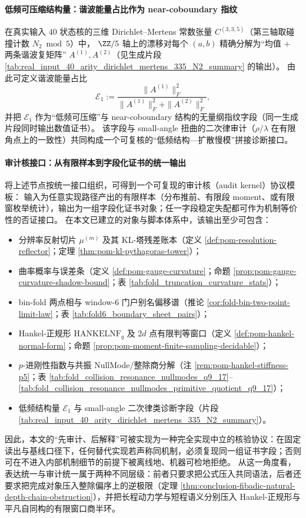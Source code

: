 \paragraph{低频可压缩结构量：谐波能量占比作为 near-coboundary 指纹}
在真实输入 \(40\) 状态核的三维 Dirichlet--Mertens 常数张量 \(C^{(3,3,5)}\)（第三轴取碰撞计数 \(N_2\bmod 5\)）中，
\(\ZZ/5\) 轴上的漂移对每个 \((a,b)\) 精确分解为“均值 \(+\) 两条谐波复矩阵” \(A^{(1)},A^{(2)}\)（见生成片段 \ref{tab:real_input_40_arity_dirichlet_mertens_335_N2_summary} 的输出）。
由此可定义谐波能量占比
\[
\mathcal{E}_1:=\frac{\|A^{(1)}\|_F^2}{\|A^{(1)}\|_F^2+\|A^{(2)}\|_F^2},
\]
并把 \(\mathcal{E}_1\) 作为“低频可压缩”与 near-coboundary 结构的无量纲指纹字段（同一生成片段同时输出数值证书）。
该字段与 small-angle 扭曲的二次律审计（\(\rho/\lambda\) 在有限角点上的一致性）共同构成一个可复核的“低频结构—扩散慢模”拼接诊断接口。

\paragraph{审计核接口：从有限样本到字段化证书的统一输出}
将上述节点按统一接口组织，可得到一个可复现的审计核（audit kernel）协议模板：
输入为任意实现路径产出的有限样本（分布推前、有限段 moment、或有限窗枚举统计），输出为一组字段化证书对象；任一字段稳定失配都可作为机制等价性的否证接口。
在本文已建立的对象与脚本体系中，该输出至少可包含：
\begin{itemize}
  \item 分辨率反射切片 \(\mu^{(m)}\) 及其 KL-塔残差账本（定义 \ref{def:pom-resolution-reflector}；定理 \ref{thm:pom-kl-pythagoras-tower}）；
  \item 曲率概率与误差条（定义 \ref{def:pom-gauge-curvature}；命题 \ref{prop:pom-gauge-curvature-shadow-bound}；表 \ref{tab:fold_truncation_curvature_stats}）；
  \item bin-fold 两点相与 window-\(6\) 门户别名偏移谱（推论 \ref{cor:fold-bin-two-point-limit-law}；表 \ref{tab:fold6_boundary_sheet_pairs}）；
  \item Hankel-正规形 \(\mathrm{HANKELNF}_q\) 及 \(2d\) 点有限判等窗口（定义 \ref{def:pom-hankel-normal-form}；命题 \ref{prop:pom-moment-finite-sampling-decidable}）；
  \item \(p\)-进刚性指数与共振 NullMode/整除商分解（注 \ref{rem:pom-hankel-stiffness-p5}；表 \ref{tab:fold_collision_resonance_nullmodes_q9_17}--\ref{tab:fold_collision_resonance_nullmodes_primitive_quotient_q9_17}）；
  \item 低频结构量 \(\mathcal{E}_1\) 与 small-angle 二次律类诊断字段（片段 \ref{tab:real_input_40_arity_dirichlet_mertens_335_N2_summary}）。
\end{itemize}
因此，本文的“先审计、后解释”可被实现为一种完全实现中立的核验协议：在固定读出与基线口径下，任何替代实现若声称同机制，必须复现同一组证书字段；否则可在不进入内部机制细节的前提下被离线地、机器可检地拒绝。
从这一角度看，表达统一与审计统一属于两种不同层级：前者只要求把公式压入共同语法，后者还要求把完成对象压入整除偏序上的逆极限（定理 \ref{thm:conclusion-fibadic-natural-depth-chain-obstruction}），并把长程动力学与短程语义分别压入 Hankel-正规形与平凡自同构的有限窗口商半环。
